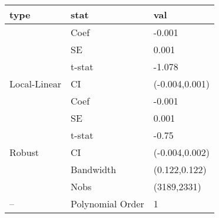 
\begin{tabular}{lll}
\toprule
type & stat & val\\
\midrule
 & Coef & -0.001\\

 & SE & 0.001\\

 & t-stat & -1.078\\

\multirow{-4}{*}{\raggedright\arraybackslash Local-Linear} & CI & (-0.004,0.001)\\
\cmidrule{1-3}
 & Coef & -0.001\\

 & SE & 0.001\\

 & t-stat & -0.75\\

\multirow{-4}{*}{\raggedright\arraybackslash Robust} & CI & (-0.004,0.002)\\
\cmidrule{1-3}
 & Bandwidth & (0.122,0.122)\\

 & Nobs & (3189,2331)\\

\multirow{-3}{*}{\raggedright\arraybackslash --} & Polynomial Order & 1\\
\bottomrule
\end{tabular}